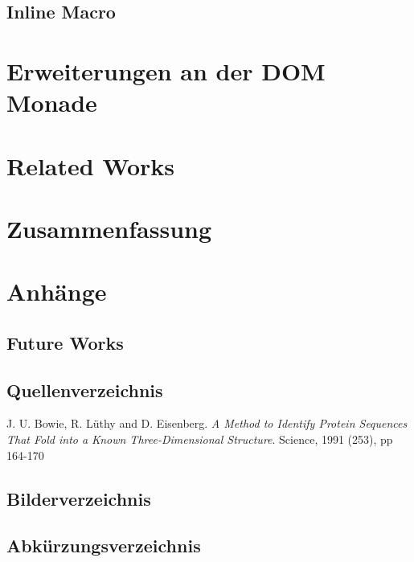 \documentclass[12pt,a4paper]{report}
\begin{document}
\section{Inline Macro}
\label{sec:inline-macro}

\chapter{Erweiterungen an der DOM Monade}
\label{chap:dom-monad-extensions}

\chapter{Related Works}
\label{chap:related-works}

\chapter{Zusammenfassung}
\label{chap:summary}

\chapter{Anhänge}
\label{chap:anhänge}

\section{Future Works}
\label{sec:future-works}

\section{Quellenverzeichnis}

\begin{thebibliography}{------}
\label{sec:bib}
	J. U. Bowie, R. L\"uthy and D. Eisenberg.
	{\em A Method to Identify Protein Sequences That Fold 
	into a Known Three-Dimensional Structure}.
	Science, 1991 (253), pp 164-170
\end{thebibliography}

\section{Bilderverzeichnis}


\section{Abkürzungsverzeichnis}
\end{document}
